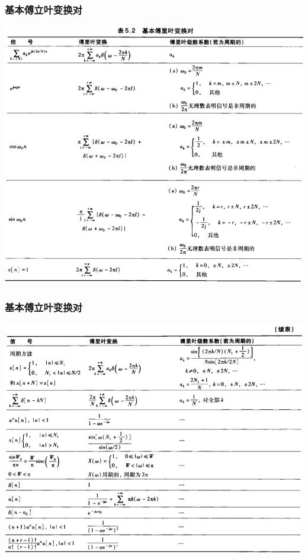 \documentclass[CJKutf8,xcolor=pdftex,dvipsnames,table]{beamer}
\begin{document}
\begin{CJK*}{UTF8}{song}
  \begin{frame}
    \frametitle{基本傅立叶变换对}
    \begin{center}
      \includegraphics[scale=.32]{ss-c-t5-2a}
    \end{center}
  \end{frame}  
   
  \begin{frame}
    \frametitle{基本傅立叶变换对}
    \begin{center}
      \includegraphics[scale=.32]{ss-c-t5-2b}
    \end{center}
  \end{frame}      
    

\end{CJK*}
\end{document}
